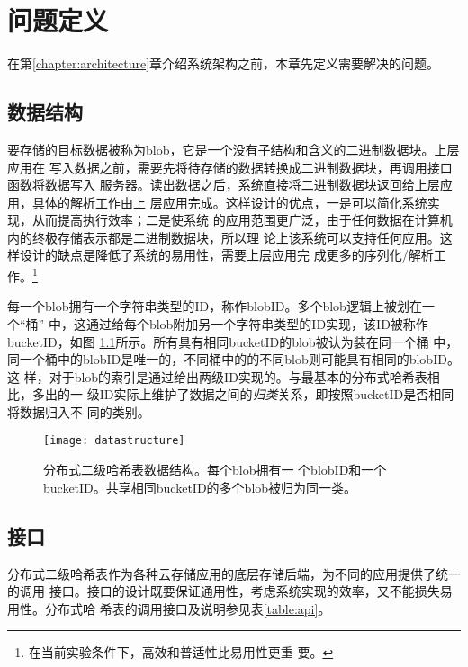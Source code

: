 \chapter{问题定义}\label{chapter:def}
在第\ref{chapter:architecture}章介绍系统架构之前，本章先定义需要解决的问题。

\section{数据结构}
要存储的目标数据被称为blob，它是一个没有子结构和含义的二进制数据块。上层应用在
写入数据之前，需要先将待存储的数据转换成二进制数据块，再调用接口函数将数据写入
服务器。读出数据之后，系统直接将二进制数据块返回给上层应用，具体的解析工作由上
层应用完成。这样设计的优点，一是可以简化系统实现，从而提高执行效率；二是使系统
的应用范围更广泛，由于任何数据在计算机内的终极存储表示都是二进制数据块，所以理
论上该系统可以支持任何应用。这样设计的缺点是降低了系统的易用性，需要上层应用完
成更多的序列化/解析工作。\footnote{在当前实验条件下，高效和普适性比易用性更重
要。}

每一个blob拥有一个字符串类型的ID，称作blobID。多个blob逻辑上被划在一个``桶''
中，这通过给每个blob附加另一个字符串类型的ID实现，该ID被称作bucketID，如图
\ref{figure:datastructure}所示。所有具有相同bucketID的blob被认为装在同一个桶
中，同一个桶中的blobID是唯一的，不同桶中的的不同blob则可能具有相同的blobID。这
样，对于blob的索引是通过给出两级ID实现的。与最基本的分布式哈希表相比，多出的一
级ID实际上维护了数据之间的\emph{归类}关系，即按照bucketID是否相同将数据归入不
同的类别。
\begin{figure}[htb]
  \centering
  \texttt{[image: datastructure]}
  \caption[分布式二级哈希表数据结构]{分布式二级哈希表数据结构。每个blob拥有一
  个blobID和一个bucketID。共享相同bucketID的多个blob被归为同一类。}
  \label{figure:datastructure}
\end{figure}

\section{接口}\label{section:api}
分布式二级哈希表作为各种云存储应用的底层存储后端，为不同的应用提供了统一的调用
接口。接口的设计既要保证通用性，考虑系统实现的效率，又不能损失易用性。分布式哈
希表的调用接口及说明参见表\ref{table:api}。

